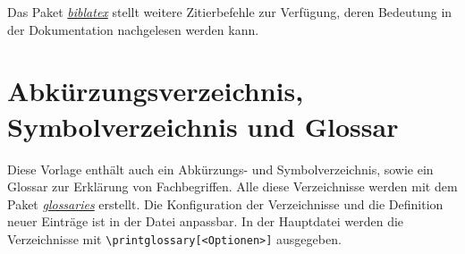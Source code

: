 Das Paket \href{https://ctan.org/pkg/biblatex?lang=de}{\textit{biblatex}} stellt weitere Zitierbefehle zur Verfügung, deren Bedeutung in der Dokumentation nachgelesen werden kann.


\section{Abkürzungsverzeichnis, Symbolverzeichnis und Glossar}
Diese Vorlage enthält auch ein Abkürzungs- und Symbolverzeichnis, sowie ein Glossar zur Erklärung von Fachbegriffen. Alle diese Verzeichnisse werden mit dem Paket \href{https://ctan.org/pkg/glossaries?lang=de}{\textit{glossaries}} erstellt. Die Konfiguration der Verzeichnisse und die Definition neuer Einträge ist in der Datei  anpassbar. In der Hauptdatei werden die Verzeichnisse mit \verb|\printglossary[<Optionen>]| ausgegeben.
